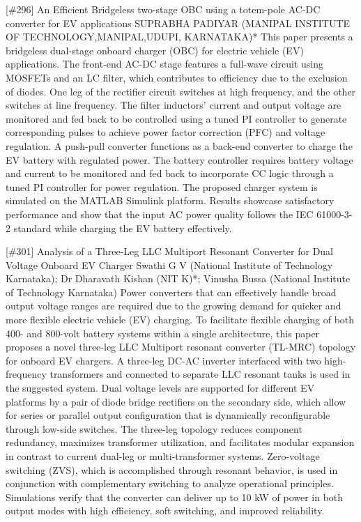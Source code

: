{} \begin{abstract_online} {[\#296] An Efficient Bridgeless two-stage OBC using a totem-pole AC-DC converter for EV applications   } {} {SUPRABHA PADIYAR (MANIPAL INSTITUTE OF TECHNOLOGY,MANIPAL,UDUPI, KARNATAKA)*} {} This paper presents a bridgeless dual-stage onboard charger (OBC) for electric vehicle (EV) applications. The front-end AC-DC stage features a full-wave circuit using MOSFETs and an LC filter, which contributes to efficiency due to the exclusion of diodes. One leg of the rectifier circuit switches at high frequency, and the other switches at line frequency. The filter inductors' current and output voltage are monitored and fed back to be controlled using a tuned PI controller to generate corresponding pulses to achieve power factor correction (PFC) and voltage regulation. A push-pull converter functions as a back-end converter to charge the EV battery with regulated power. The battery controller requires battery voltage and current to be monitored and fed back to incorporate CC logic through a tuned PI controller for power regulation.  The proposed charger system is simulated on the MATLAB Simulink platform. Results showcase satisfactory performance and show that the input AC power quality follows the IEC 61000-3-2 standard while charging the EV battery effectively.  \end{abstract_online} 
{} \begin{abstract_online} {[\#301] Analysis of a Three-Leg  LLC Multiport Resonant Converter for Dual Voltage Onboard EV Charger} {} {Swathi G V (National Institute of Technology Karnataka); Dr Dharavath  Kishan (NIT K)*; Vinusha Bussa (National Institute of Technology Karnataka)} {}  Power converters that can effectively handle broad output  voltage ranges are required due to the growing demand for quicker and more flexible electric vehicle (EV) charging. To facilitate flexible charging of both 400- and 800-volt battery systems within a single architecture, this paper proposes a novel three-leg LLC Multiport resonant converter (TL-MRC) topology for onboard EV chargers. A three-leg DC-AC inverter interfaced with two high-frequency transformers and connected to separate LLC resonant tanks is used in the suggested system. Dual voltage levels are supported for different EV platforms by a pair of diode bridge rectifiers on the secondary side, which allow for series or parallel output configuration that is dynamically reconfigurable through low-side switches. The three-leg topology reduces component redundancy, maximizes transformer utilization, and facilitates modular expansion in contrast to current dual-leg or multi-transformer systems. Zero-voltage switching (ZVS), which is accomplished through resonant behavior, is used in conjunction with complementary switching to analyze operational principles. Simulations verify that the converter can deliver up to 10 kW of power in both output modes with high efficiency, soft switching, and improved reliability. \end{abstract_online} 
